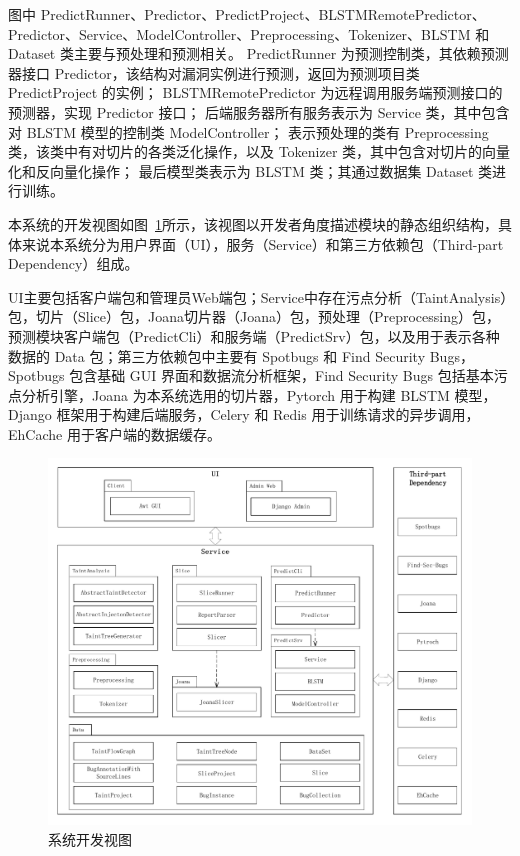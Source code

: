 图中 PredictRunner、Predictor、PredictProject、BLSTMRemotePredictor、Predictor、Service、ModelController、Preprocessing、Tokenizer、BLSTM 和 Dataset 类主要与预处理和预测相关。
PredictRunner 为预测控制类，其依赖预测器接口 Predictor，该结构对漏洞实例进行预测，返回为预测项目类 PredictProject 的实例；
BLSTMRemotePredictor 为远程调用服务端预测接口的预测器，实现 Predictor 接口；
后端服务器所有服务表示为 Service 类，其中包含对 BLSTM 模型的控制类 ModelController；
表示预处理的类有 Preprocessing 类，该类中有对切片的各类泛化操作，以及 Tokenizer 类，其中包含对切片的向量化和反向量化操作；
最后模型类表示为 BLSTM 类；其通过数据集 Dataset 类进行训练。


本系统的开发视图如图~\ref{view:dev}所示，该视图以开发者角度描述模块的静态组织结构，具体来说本系统分为用户界面（UI），服务（Service）和第三方依赖包（Third-part Dependency）组成。

UI主要包括客户端包和管理员Web端包；Service中存在污点分析（TaintAnalysis）包，切片（Slice）包，Joana切片器（Joana）包，预处理（Preprocessing）包，预测模块客户端包（PredictCli）和服务端（PredictSrv）包，以及用于表示各种数据的 Data 包；第三方依赖包中主要有 Spotbugs 和 Find Security Bugs，Spotbugs 包含基础 GUI 界面和数据流分析框架，Find Security Bugs 包括基本污点分析引擎，Joana 为本系统选用的切片器，Pytorch 用于构建 BLSTM 模型，Django 框架用于构建后端服务，Celery 和 Redis 用于训练请求的异步调用，EhCache 用于客户端的数据缓存。

\begin{figure}[!htb]
	\centering
	\includegraphics[width=5in]{FIGs/chapter3/viewdev.pdf}
	\caption{系统开发视图}\label{view:dev}
\end{figure}


